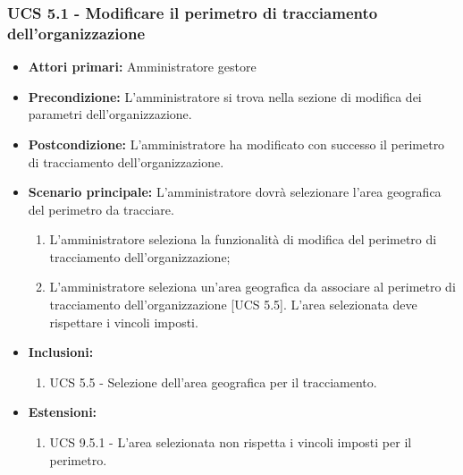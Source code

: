 \subsubsection{UCS 5.1 - Modificare il perimetro di tracciamento dell'organizzazione}%
\begin{itemize}
    \item \textbf{Attori primari:} Amministratore gestore
    \item \textbf{Precondizione:} L'amministratore si trova nella sezione di modifica dei parametri dell'organizzazione.
    \item \textbf{Postcondizione:} L'amministratore ha modificato con successo il perimetro di tracciamento dell'organizzazione.
    \item \textbf{Scenario principale:} L'amministratore dovrà selezionare l'area geografica del perimetro da tracciare.
    \begin{enumerate}%
        \item L'amministratore seleziona la funzionalità di modifica del perimetro di tracciamento dell'organizzazione;
        \item L'amministratore seleziona un'area geografica da associare al perimetro di tracciamento dell'organizzazione [UCS 5.5]. L'area selezionata deve rispettare i vincoli imposti.
    \end{enumerate}
    \item \textbf{Inclusioni:}
    \begin{enumerate}
        \item UCS 5.5 - Selezione dell'area geografica per il tracciamento.
    \end{enumerate}
    \item \textbf{Estensioni:}
    \begin{enumerate}
        \item UCS 9.5.1 - L'area selezionata non rispetta i vincoli imposti per il perimetro.
    \end{enumerate}
\end{itemize}

